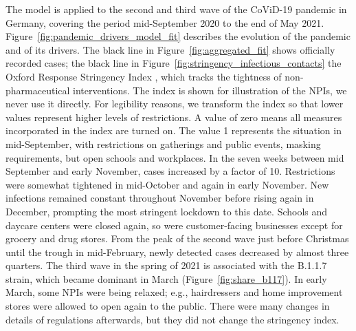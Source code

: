 The model is applied to the second and third wave of the CoViD-19 pandemic in Germany,
covering the period mid-September 2020 to the end of May 2021.
Figure~\ref{fig:pandemic_drivers_model_fit} describes the evolution of the pandemic and
of its drivers. The black line in Figure~\ref{fig:aggregated_fit} shows officially
recorded cases; the black line in Figure~\ref{fig:stringency_infectious_contacts} the
Oxford Response Stringency Index \citep{Hale2020}, which tracks the tightness of
non-pharmaceutical interventions. The index is shown for illustration of the NPIs, we
never use it directly. For legibility reasons, we transform the index so that lower
values represent higher levels of restrictions. A value of zero means all measures
incorporated in the index are turned on. The value 1 represents the situation in
mid-September, with restrictions on gatherings and public events, masking requirements,
but open schools and workplaces. In the seven weeks between mid September and early
November, cases increased by a factor of 10. Restrictions were somewhat tightened in
mid-October and again in early November. New infections remained constant throughout
November before rising again in December, prompting the most stringent lockdown to this
date. Schools and daycare centers were closed again, so were customer-facing businesses
except for grocery and drug stores. From the peak of the second wave just before
Christmas until the trough in mid-February, newly detected cases decreased by almost
three quarters. The third wave in the spring of 2021 is associated with the B.1.1.7
strain, which became dominant in March (Figure~\ref{fig:share_b117}). In early March,
some NPIs were being relaxed; e.g., hairdressers and home improvement stores were
allowed to open again to the public. There were many changes in details of regulations
afterwards, but they did not change the stringency index.

